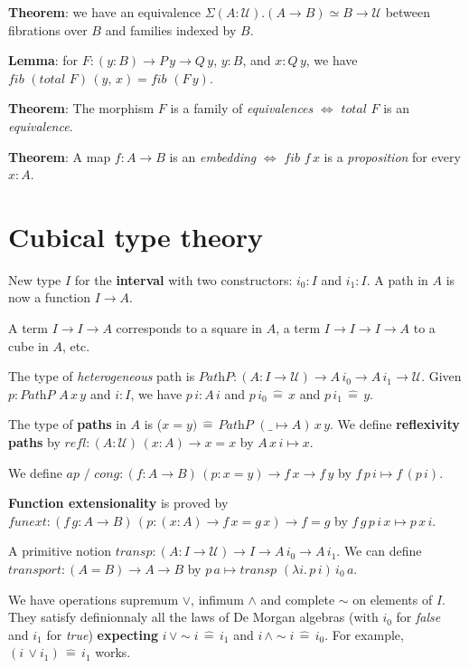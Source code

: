 \documentclass[a4paper]{article}
\begin{document}
\textbf{Theorem}: we have an equivalence $\Sigma(A : \mathcal{U}).(A \to B) \simeq B \to \mathcal{U}$ between fibrations over $B$ and families indexed by $B$.

\textbf{Lemma}: for $F : (y : B) \to P \, y \to Q \, y$, $y : B$, and $x : Q \, y$, we have $\textit{fib } (\textit{total } F) \, (y, \, x) = \textit{fib } (F \, y)$.

\textbf{Theorem}: The morphism $F$ is a family of \textit{equivalences} $\iff$ $\textit{total } F$ is an \textit{equivalence}.

\textbf{Theorem}: A map $f : A \to B$ is an \textit{embedding} $\iff$ $\textit{fib } f \, x$ is a \textit{proposition} for every $x : A$.

\section*{Cubical type theory}

New type $I$ for the \textbf{interval} with two constructors: $i_0 : I$ and $i_1 : I$. A path in $A$ is now a function $I \to A$.

A term $I \to I \to A$ corresponds to a square in $A$, a term $I \to I \to I \to A$ to a cube in $A$, etc.

The type of \textit{heterogeneous} path is $\textit{PathP} : (A : I \to \mathcal{U}) \to A \, i_0 \to A \, i_1 \to \mathcal{U}$. Given $p : \textit{PathP } A \, x \, y$ and $i : I$, we have $p \, i : A \, i$ and $p \, i_0 \, \hat{=} \, x$ and $p \, i_1 \, \hat{=} \, y$.

The type of \textbf{paths} in $A$ is ($x = y) \, \hat{=} \, \textit{PathP } (\_ \mapsto A) \, x \, y$. We define \textbf{reflexivity paths} by $\textit{refl} : (A : \mathcal{U}) \, (x : A) \to x = x$ by $A \, x \, i \mapsto x$.

We define $\textit{ap / cong} : (f : A \to B) \, (p : x = y) \to f \, x \to f \, y$ by $f \, p \, i \mapsto f \, (p \, i)$.

\textbf{Function extensionality} is proved by $\textit{funext} : (f \, g : A \to B) \, (p : (x : A) \to f \, x = g \, x) \to f = g$ by $f \, g \, p \, i \, x \mapsto p \, x \, i$.

A primitive notion $\textit{transp} : (A : I \to \mathcal{U}) \to I \to A \, i_0 \to A \, i_1$. We can define $\textit{transport} : (A = B) \to A \to B$ by $p \, a \mapsto \textit{transp } (\lambda i. \, p \, i) \, i_0 \, a$.

We have operations supremum $\vee$, infimum $\wedge$ and complete $\sim$ on elements of $I$. They satisfy definionnaly all the laws of De Morgan algebras (with $i_0$ for \textit{false} and $i_1$ for \textit{true}) \textbf{expecting} $i \, \vee \sim i \, \hat{=} \, i_1$ and $i \, \wedge \sim i \, \hat{=} \, i_0$. For example, $(i \, \vee i_1) \, \hat{=} \, i_1$ works.
\end{document}

